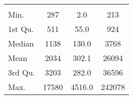 \begin{tabular}{lS[table-format=5.1]S[table-format=5.1]S[table-format=5.1]}
&  &  &  \\
 Min.    & 287 & 2.0 & 213 \\
 1st Qu. & 511 & 55.0 & 924 \\
 Median  & 1138 & 130.0 & 3768 \\
 Mean    & 2034 & 302.1 & 26094 \\
 3rd Qu. & 3203 & 282.0 & 36596 \\
 Max.    & 17580 & 4516.0 & 242078 \\
\end{tabular}
